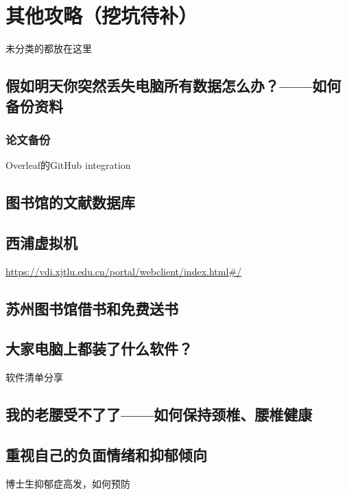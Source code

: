 
\chapter{其他攻略（挖坑待补）}

未分类的都放在这里

\section{假如明天你突然丢失电脑所有数据怎么办？——如何备份资料}
\subsection{论文备份}
Overleaf的GitHub integration
\section{图书馆的文献数据库}

\section{西浦虚拟机}
\url{https://vdi.xjtlu.edu.cn/portal/webclient/index.html#/}
\section{苏州图书馆借书和免费送书}
\section{大家电脑上都装了什么软件？}
软件清单分享
\section{我的老腰受不了了——如何保持颈椎、腰椎健康}
\section{重视自己的负面情绪和抑郁倾向}
博士生抑郁症高发，如何预防
